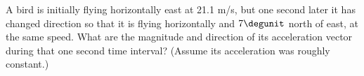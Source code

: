 A bird is initially flying horizontally east at 21.1
        m/s, but one second later it has changed direction so that
        it is flying horizontally and $7\degunit$ north of east, at the same
        speed. What are the magnitude and direction of its
        acceleration vector during that one second time interval?
        (Assume its acceleration was roughly constant.) \answercheck

